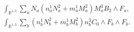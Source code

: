 \begin{equation}
\begin{aligned}
\int_{\mathbb{R}^{1,3}}\sum_a N_a (n^1_a N^2_a+m^1_a M^2_a) M^3_a B_2 \wedge F_a,\\
\int_{\mathbb{R}^{1,3}}\sum_b  (n^1_b N^2_b+m^1_b M^2_b) n^3_b C_0 \wedge F_b\wedge F_b.
\end{aligned}\label{EqOrbitsGScouplings}
\end{equation}

